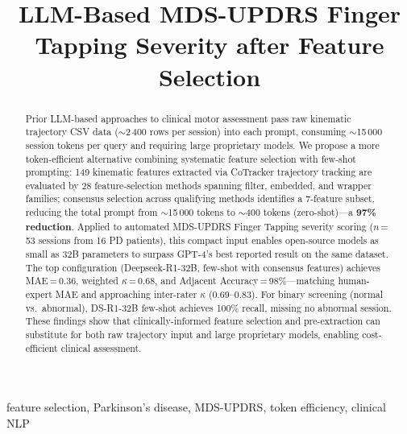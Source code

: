 \documentclass[conference]{IEEEtran}
\begin{document}
\title{LLM-Based MDS-UPDRS Finger Tapping Severity after Feature Selection}

\author{
}

\maketitle

\begin{abstract}
Prior LLM-based approaches to clinical motor assessment pass raw kinematic trajectory
CSV data ($\sim$2\,400 rows per session) into each prompt, consuming
$\sim$15\,000 session tokens per query and requiring large proprietary models.
We propose a more token-efficient alternative combining systematic feature selection
with few-shot prompting: 149 kinematic features extracted via CoTracker trajectory
tracking are evaluated by 28 feature-selection methods spanning filter, embedded,
and wrapper families; consensus selection across qualifying methods identifies a
7-feature subset, reducing the total prompt from $\sim$15\,000 tokens to
$\sim$400 tokens (zero-shot)---a \textbf{97\% reduction}. Applied to automated MDS-UPDRS Finger Tapping severity scoring
($n$\,=\,53 sessions from 16 PD patients), this compact input enables open-source models
as small as 32B parameters to surpass GPT-4's best reported result on the same dataset.
The top configuration (Deepseek-R1-32B, few-shot with consensus features) achieves
MAE\,=\,0.36, weighted $\kappa$\,=\,0.68, and Adjacent Accuracy\,=\,98\%---matching
human-expert MAE and approaching inter-rater $\kappa$ (0.69--0.83).
For binary screening (normal vs.\ abnormal), DS-R1-32B few-shot achieves 100\% recall,
missing no abnormal session. These findings show that clinically-informed feature
selection and pre-extraction can substitute for both raw trajectory input and large
proprietary models, enabling cost-efficient clinical assessment.
\end{abstract}

\begin{IEEEkeywords}
feature selection, Parkinson's disease, MDS-UPDRS, token efficiency, clinical NLP
\end{IEEEkeywords}
\end{document}
